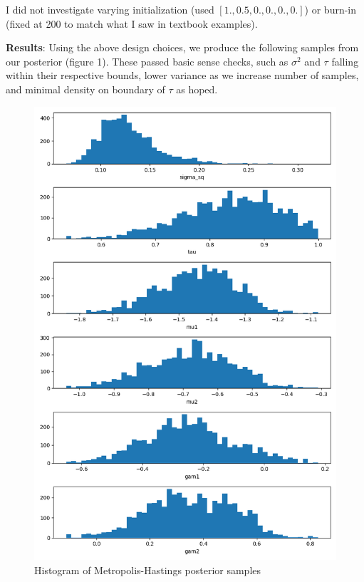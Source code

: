 \documentclass[12pt,letterpaper,twoside]{article}
\begin{document}
\begin{enumerate}[label=(\alph*)]
I did not investigate varying initialization (used $[1., 0.5, 0., 0., 0., 0.]$)
or burn-in (fixed at 200 to match what I saw in textbook examples).
\end{enumerate}

\textbf{Results}: Using the above design choices, we produce the following 
samples from our posterior (figure 1). These passed basic 
sense checks, such as $\sigma^2$ and $\tau$ falling within 
their respective bounds, lower variance as we increase number 
of samples, and minimal density on boundary of $\tau$ as hoped.
\begin{figure}[H]
    \centering
    \includegraphics[scale=0.7]{mh_sampled_histogram.png}
    \caption{Histogram of Metropolis-Hastings posterior samples}
\end{figure}
\end{document}
